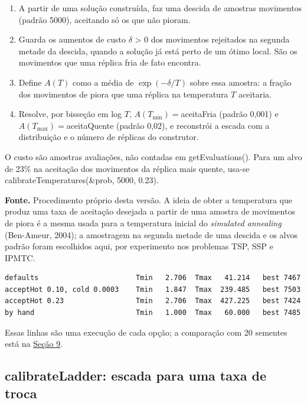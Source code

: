 \documentclass[10pt,a4paper]{article}
\newcommand{\code}[1]{{\ttfamily #1}}
\begin{document}
\begin{enumerate}
\item A partir de uma solução construída, faz uma descida de \code{amostras} movimentos (padrão 5000), aceitando só os que não pioram.
\item Guarda os aumentos de custo $\delta$ > 0 dos movimentos rejeitados na segunda metade da descida, quando a solução já está perto de um ótimo local. São os movimentos que uma réplica fria de fato encontra.
\item Define $A(T)$ como a média de $\exp(-\delta/T)$ sobre essa amostra: a fração dos movimentos de piora que uma réplica na temperatura $T$ aceitaria.
\item Resolve, por bisseção em log $T$, $A(T_{\mathrm{min}}) = {}$\code{aceitaFria} (padrão 0,001) e $A(T_{\mathrm{max}}) = {}$\code{aceitaQuente} (padrão 0,02), e reconstrói a escada com a distribuição e o número de réplicas do construtor. \end{enumerate}

O custo são \code{amostras} avaliações, não contadas em \code{getEvaluations()}. Para um alvo de 23\% na aceitação dos movimentos da réplica mais quente, usa-se \code{calibrateTemperatures(\allowbreak{}\&prob, 5000, 0.23)}.

\begin{fonte}
\textbf{Fonte.} Procedimento próprio desta versão. A ideia de obter a temperatura que produz uma taxa de aceitação desejada a partir de uma amostra de movimentos de piora é a mesma usada para a temperatura inicial do \textit{simulated annealing} (Ben-Ameur, 2004); a amostragem na segunda metade de uma descida e os alvos padrão foram escolhidos aqui, por experimento nos problemas TSP, SSP e IPMTC.
\end{fonte}

\begin{lstlisting}[style=saida]
defaults                       Tmin   2.706  Tmax   41.214   best 7467
acceptHot 0.10, cold 0.0003    Tmin   1.847  Tmax  239.485   best 7503
acceptHot 0.23                 Tmin   2.706  Tmax  427.225   best 7424
by hand                        Tmin   1.000  Tmax   60.000   best 7485
\end{lstlisting}

Essas linhas são uma execução de cada opção; a comparação com 20 sementes está na \hyperref[s9]{Seção 9}.

\subsection{\code{calibrateLadder}: escada para uma taxa de troca}
\end{document}
